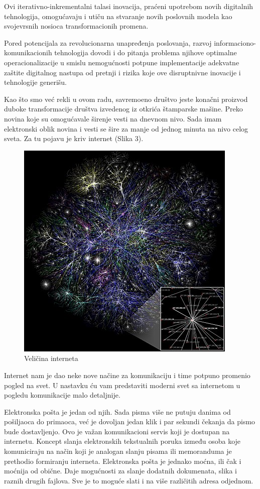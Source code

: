 \documentclass[10pt]{article}
\begin{document}
	Ovi iterativno-inkrementalni talasi inovacija, praćeni upotrebom novih digitalnih tehnologija, omogućavaju i utiču na stvaranje novih poslovnih modela kao svojevrsnih nosioca transformacionih promena. 
	
	Pored potencijala za revolucionarna unapređenja poslovanja, razvoj informaciono-komunikacionih tehnologija dovodi i do pitanja problema njihove optimalne operacionalizacije u smislu nemogućnosti potpune implementacije adekvatne zaštite digitalnog nastupa od pretnji i rizika koje ove disruptnivne inovacije i tehnologije generišu.
	
	Kao što smo već rekli u ovom radu, savremoeno društvo jeste konačni proizvod duboke transformacije društva izvedenog iz otkrića štamparske mašine. Preko novina koje su omogućavale širenje vesti na dnevnom nivo. Sada imam elektronski oblik novina i vesti se šire za manje od jednog minuta na nivo celog sveta.  Za tu pojavu je kriv internet (Slika 3). 


\begin{figure}
    \centering
    \includegraphics[scale=0.4]{internet.jpg}
    \caption{Veličina interneta}
\end{figure}
	

	Internet nam je dao neke nove načine za komunikaciju i time potpuno promenio pogled na svet. U nastavku ću vam predstaviti moderni svet sa internetom u pogledu komunikacije malo detaljnije.
	
	Elektronska pošta je jedan od njih. Sada pisma više ne putuju danima od pošiljaoca do primaoca, već je dovoljan jedan klik i par sekundi čekanja da pismo bude dostavljenjo. Ovo je važan komunikacioni servis koji je dostupan na internetu. Koncept slanja elektronskih tekstualnih poruka između osoba koje komuniciraju na način koji je analogan slanju pisama ili memoranduma je prethodio formiranju interneta. Elektronska pošta je jednako moćna, ili čak i moćnija od obične. Daje mogućnosti za slanje dodatnih dokumenata, slika i raznih drugih fajlova. Sve je to moguće slati i na više različitih adresa odjednom.
	
\end{document}
